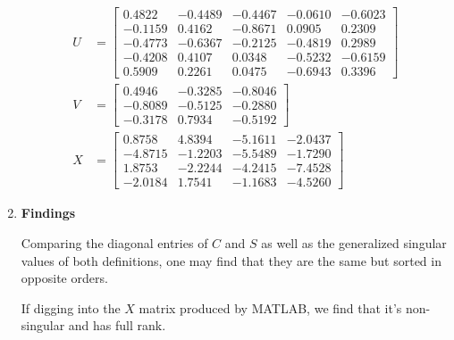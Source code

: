 \begin{enumerate}[(1).]
            \begin{align*}
                U &= \begin{bmatrix}
                    0.4822 &  -0.4489 &  -0.4467 &  -0.0610 &  -0.6023 \\
                   -0.1159 &   0.4162 &  -0.8671 &   0.0905 &   0.2309 \\
                   -0.4773 &  -0.6367 &  -0.2125 &  -0.4819 &   0.2989 \\
                   -0.4208 &   0.4107 &   0.0348 &  -0.5232 &  -0.6159 \\
                    0.5909 &   0.2261 &   0.0475 &  -0.6943 &   0.3396
                \end{bmatrix} \\
                V &= \begin{bmatrix}
                    0.4946 &  -0.3285 &  -0.8046 \\
                   -0.8089 &  -0.5125 &  -0.2880 \\
                   -0.3178 &   0.7934 &  -0.5192
                \end{bmatrix} \\
                X &= \begin{bmatrix}
                    0.8758 &  4.8394  & -5.1611 & -2.0437 \\
                   -4.8715 & -1.2203  & -5.5489 & -1.7290 \\
                    1.8753 & -2.2244  & -4.2415 & -7.4528 \\
                   -2.0184 &  1.7541  & -1.1683 & -4.5260
                \end{bmatrix}
            \end{align*}
        
        \item \textbf{Findings}
        
        Comparing the diagonal entries of $C$ and $S$ as well as the generalized singular values of both definitions, one may find that they are the same but sorted in opposite orders.
        
        If digging into the $X$ matrix produced by MATLAB, we find that it's non-singular and has full rank.  
        
    \end{enumerate}
            

